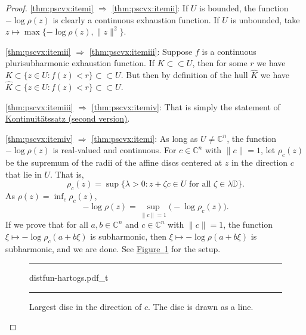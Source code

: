 \documentclass[12pt,openany]{book}
\newcommand{\snorm}[1]{\lVert {#1} \rVert}
\newcommand{\C}{{\mathbb{C}}}
\newcommand{\D}{{\mathbb{D}}}
\theoremstyle{plain}
\theoremstyle{remark}
\theoremstyle{definition}
\newenvironment{myfig}{%
\begin{figure}[h!t]
\noindent\rule{\textwidth}{0.5pt}\vspace{12pt}\par\centering}%
{\par\noindent\rule{\textwidth}{0.5pt}
\end{figure}}
\theoremstyle{exercise}
\theoremstyle{example}
\newcommand{\figureref}[1]{\hyperref[#1]{Figure~\ref*{#1}}}
\begin{document}
\begin{proof}
\ref{thm:pscvx:itemi}
$\Rightarrow$
\ref{thm:pscvx:itemii}:
If $U$ is bounded,
the function $-\log \rho(z)$ is clearly a continuous exhaustion function.
If $U$ is unbounded, take
$z \mapsto \max \{ -\log \rho(z) , \snorm{z}^2 \}$.

\ref{thm:pscvx:itemii}
$\Rightarrow$
\ref{thm:pscvx:itemiii}:
Suppose $f$ is a continuous plurisubharmonic exhaustion function.
If $K \subset \subset U$, then for some $r$ we have
$K \subset \{ z \in U : f(z) < r \} \subset \subset U$.
But then by definition of the hull $\widehat{K}$ we have
$\widehat{K} \subset \{ z \in U : f(z) < r \} \subset \subset U$.

\ref{thm:pscvx:itemiii}
$\Rightarrow$
\ref{thm:pscvx:itemiv}:
That is simply the statement of
\hyperref[thm:contprinciple2]{Kontinuit\"atssatz (second version)}.

\ref{thm:pscvx:itemiv}
$\Rightarrow$
\ref{thm:pscvx:itemi}:
As long as $U \neq \C^n$,
the function $-\log \rho(z)$ is real-valued and continuous.
For $c \in \C^n$ with $\snorm{c}=1$, let
$\rho_c(z)$ be the supremum of the radii of the affine discs centered at $z$
in the direction $c$ that lie in $U$.  That is,
\begin{equation*}
\rho_c(z) =
\sup \bigl\{ \lambda > 0 :
z+ \zeta c \in U \text{ for all $\zeta \in \lambda\D$} \bigr\} .
\end{equation*}
As $\rho(z) = \inf_c \rho_c(z)$,
\begin{equation*}
- \log \rho(z) = \sup_{\snorm{c}=1} \bigl(-\log \rho_c(z)\bigr) .
\end{equation*}
If we prove that for all $a, b \in \C^n$ and
$c \in \C^n$ with $\snorm{c}=1$, the function $\xi \mapsto -\log \rho_c(a+b\xi)$ is
subharmonic, then $\xi \mapsto - \log \rho(a+b\xi)$ is subharmonic,
and we are done.
See \figureref{fig:distfun-hartogs} for the setup.
\begin{myfig}
{distfun-hartogs.pdf_t}
\caption{Largest disc in the direction of $c$.
The disc is drawn as a line.\label{fig:distfun-hartogs}}
\end{myfig}


\end{proof}
\end{document}
